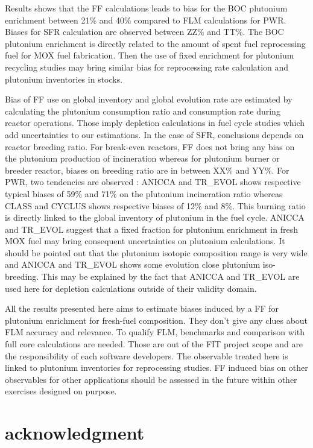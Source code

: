 Results shows that the FF calculations leads to bias for the BOC plutonium enrichment between 21\% and 40\% compared to FLM calculations for PWR. Biases for SFR calculation are observed between ZZ\% and TT\%. The BOC plutonium enrichment is directly related to the amount of spent fuel reprocessing fuel for MOX fuel fabrication. Then the use of fixed enrichment for plutonium recycling studies may bring similar bias for reprocessing rate calculation and plutonium inventories in stocks. 

Bias of FF use on global inventory and global evolution rate are estimated by calculating the plutonium consumption ratio and consumption rate during reactor operations. Those imply depletion calculations in fuel cycle studies which add uncertainties to our estimations. In the case of SFR, conclusions depends on reactor breeding ratio. For break-even reactors, FF does not bring any bias on the plutonium production of incineration whereas for plutonium burner or breeder reactor, biases on breeding ratio are in between XX\% and YY\%. For PWR, two tendencies are observed : ANICCA and TR\_EVOL shows respective typical biases of 59\% and 71\% on the plutonium incineration ratio whereas CLASS and CYCLUS shows respective biases of 12\% and 8\%. This burning ratio is directly linked to the global inventory of plutonium in the fuel cycle. ANICCA and TR\_EVOL suggest that a fixed fraction for plutonium enrichment in fresh MOX fuel may bring consequent uncertainties on plutonium calculations. It should be pointed out that the plutonium isotopic composition range is very wide and ANICCA and TR\_EVOL shows some evolution close plutonium iso-breeding. This may be explained by the fact that ANICCA and TR\_EVOL are used here for depletion calculations outside of their validity domain.        

All the results presented here aims to estimate biases induced by a FF for plutonium enrichment for fresh-fuel composition. They don't give any clues about FLM accuracy and relevance. To qualify FLM, benchmarks and comparison with full core calculations are needed. Those are out of the FIT project scope and are the responsibility of each software developers. The observable treated here is linked to plutonium inventories for reprocessing studies. FF induced bias on other observables for other applications should be assessed in the future within other exercises designed on purpose.   

\section{acknowledgment}